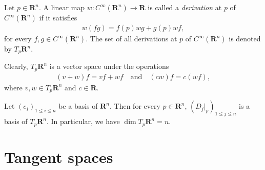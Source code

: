\begin{definition}
    Let $p \in \mathbf{R}^n$. A linear map $w : C^\infty(\mathbf{R}^n) \to \mathbf{R}$ is called a \emph{derivation} at $p$ of $C^\infty(\mathbf{R}^n)$ if it satisfies
    \begin{align*}
        w(fg) = f(p)w g + g(p)w f,
    \end{align*}
    for every $f, g \in C^\infty(\mathbf{R}^n)$. The set of all derivations at $p$ of $C^\infty(\mathbf{R}^n)$ is denoted by $T_p\mathbf{R}^n$.
\end{definition}

Clearly, $T_p\mathbf{R}^n$ is a vector space under the operations
    \begin{align*}
        (v + w)f = v f + w f
        \quad\text{and}\quad
        (cw)f = c(w f),
    \end{align*}
where $v, w \in T_p\mathbf{R}^n$ and $c \in \mathbf{R}$.

\begin{proposition}\label{lem:basis of tangent space on R^n}
    Let $(e_i)_{1 \leq i \leq n}$ be a basis of $\mathbf{R}^n$. Then for every $p \in \mathbf{R}^n$, $(D_{j}|_p)_{1 \leq j \leq n}$ is a basis of $T_p\mathbf{R}^n$. In particular, we have $\dim{T_p\mathbf{R}^n} = n$.
\end{proposition}

\begin{comment}
\begin{proof}
    We verify that $(D_{e_j}|_p)_{1 \leq j \leq n}$ spans $T_p\mathbf{R}^n$. Since $p$ can be written as $p = a_je_j$ for $a_j \in \mathbf{R}$. Let $f \in C^\infty(\mathbf{R}^n)$. By Taylor's theorem, we have
    \begin{align*}
        f(x) = f(p) + \sum_{j = 1}^{n}D_{e_j}f(p)(x_j - p_j) + \sum_{i, j = 1}^{n}(x_i - p_i)(x_j - p_j)\int_{0}^{1}(1 - t)D_{e_i}D_{e_j}f(p + t(x - p))dt.
    \end{align*}
    Then
    \begin{align*}
        wf &= w(f(p)) + \sum_{j = 1}^{n}w((x_j - p_j)D_{e_j}|_pf)\\
        &= \sum_{j = 1}^{n}(w(x_j) - w(a_j))D_{e_j}|_pf\\
        &= \sum_{j = 1}^{n}w(x_j)D_{e_j}|_pf.
    \end{align*}
\end{proof}
\end{comment}


\section{Tangent spaces}

